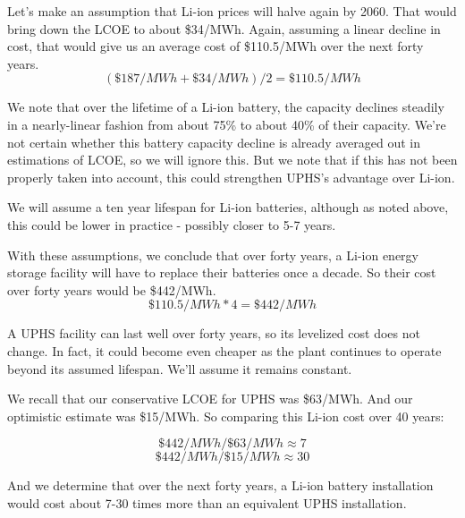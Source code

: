 Let's make an assumption that Li-ion prices will halve again by 2060. That would bring down the LCOE to about \$34/MWh. Again, assuming a linear decline in cost, that would give us an average cost of \$110.5/MWh over the next forty years.
\[ (\$187/MWh + \$34/MWh) / 2 =  \$110.5/MWh \]

We note that over the lifetime of a Li-ion battery, the capacity declines steadily in a nearly-linear fashion from about 75\% to about 40\% of their capacity. \cite{LifePredictionModelForLiIonBattery} We're not certain whether this battery capacity decline is already averaged out in estimations of LCOE, so we will ignore this. But we note that if this has not been properly taken into account, this could strengthen UPHS's advantage over Li-ion.

We will assume a ten year lifespan for Li-ion batteries, although as noted above, this could be lower in practice - possibly closer to 5-7 years.

With these assumptions, we conclude that over forty years, a Li-ion energy storage facility will have to replace their batteries once a decade. So their cost over forty years would be \$442/MWh.
\[ \$110.5/MWh * 4  = \$442/MWh \]

A UPHS facility can last well over forty years, so its levelized cost does not change. In fact, it could become even cheaper as the plant continues to operate beyond its assumed lifespan. We'll assume it remains constant.

We recall that our conservative LCOE for UPHS was \$63/MWh. And our optimistic estimate was \$15/MWh. So comparing this Li-ion cost over 40 years:

\[ \$442/MWh / \$63/MWh  \approx  7 \]
\[ \$442/MWh / \$15/MWh  \approx  30 \]

And we determine that over the next forty years, a Li-ion battery installation would cost about 7-30 times more than an equivalent UPHS installation.
